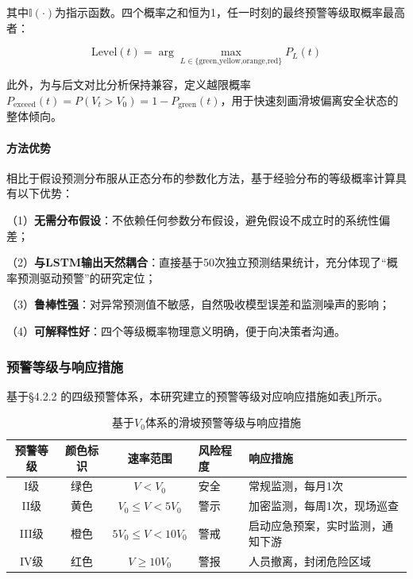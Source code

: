 \documentclass[12pt,a4paper]{article}
\newcommand{\tabcaption}[2]{%
  \caption[#1]{{\CJKfamily{songbold}#1}}}
\begin{document}
其中$\mathbb{I}(\cdot)$为指示函数。四个概率之和恒为1，任一时刻的最终预警等级取概率最高者：

\begin{equation}
\text{Level}(t) = \arg\max_{L \in \{\text{green,yellow,orange,red}\}} P_L(t)
\label{eq:level-argmax}
\end{equation}

此外，为与后文对比分析保持兼容，定义越限概率$P_{\text{exceed}}(t) = P(V_t > V_0) = 1 - P_{\text{green}}(t)$，用于快速刻画滑坡偏离安全状态的整体倾向。

\paragraph{\textbf{方法优势}}

相比于假设预测分布服从正态分布的参数化方法，基于经验分布的等级概率计算具有以下优势：

    （1）\textbf{无需分布假设}：不依赖任何参数分布假设，避免假设不成立时的系统性偏差；

    （2）\textbf{与LSTM输出天然耦合}：直接基于50次独立预测结果统计，充分体现了“概率预测驱动预警”的研究定位；

    （3）\textbf{鲁棒性强}：对异常预测值不敏感，自然吸收模型误差和监测噪声的影响；

    （4）\textbf{可解释性好}：四个等级概率物理意义明确，便于向决策者沟通。

\subsubsection{预警等级与响应措施}

基于\S4.2.2 的四级预警体系，本研究建立的预警等级对应响应措施如表\ref{tab:warning_levels}所示。

\begin{table}[htbp]
\centering
\tabcaption{基于$V_0$体系的滑坡预警等级与响应措施}{Landslide Warning Levels and Response Protocols Based on $V_0$ Framework}
\label{tab:warning_levels}
\small
\begin{tabular}{cccp{2.2cm}p{4.5cm}}
\toprule
预警等级 & 颜色标识 & 速率范围 & 风险程度 & 响应措施 \\
\midrule
I级   & 绿色 & $V < V_0$            & 安全 & 常规监测，每月1次 \\
II级  & 黄色 & $V_0 \leq V < 5V_0$  & 警示 & 加密监测，每周1次，现场巡查 \\
III级 & 橙色 & $5V_0 \leq V < 10V_0$ & 警戒 & 启动应急预案，实时监测，通知下游 \\
IV级  & 红色 & $V \geq 10V_0$       & 警报 & 人员撤离，封闭危险区域 \\
\bottomrule
\end{tabular}
\end{table}
\end{document}

